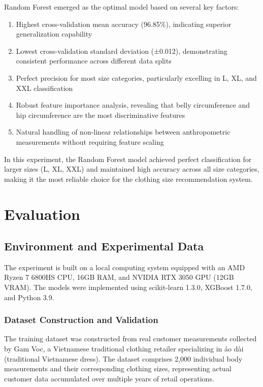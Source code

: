 \documentclass{llncs}
\begin{document}
Random Forest emerged as the optimal model based on several key factors:
\begin{enumerate}
    \item Highest cross-validation mean accuracy (96.85\%), indicating superior generalization capability
    \item Lowest cross-validation standard deviation (±0.012), demonstrating consistent performance across different data splits
    \item Perfect precision for most size categories, particularly excelling in L, XL, and XXL classification
    \item Robust feature importance analysis, revealing that belly circumference and hip circumference are the most discriminative features
    \item Natural handling of non-linear relationships between anthropometric measurements without requiring feature scaling
\end{enumerate}

In this experiment, the Random Forest model achieved perfect classification for larger sizes (L, XL, XXL) and maintained high accuracy across all size categories, making it the most reliable choice for the clothing size recommendation system.

\section{Evaluation}

\subsection{Environment and Experimental Data }
The experiment is built on a local computing system equipped with an AMD Ryzen 7 6800HS CPU, 16GB RAM, and NVIDIA RTX 3050 GPU (12GB VRAM). 
The models were implemented using scikit-learn 1.3.0, XGBoost 1.7.0, and Python 3.9.

\subsubsection{Dataset Construction and Validation}

The training dataset was constructed from real customer measurements collected by Gam Voc, a Vietnamese traditional clothing retailer specializing in áo dài (traditional Vietnamese dress). The dataset comprises 2,000 individual body measurements and their corresponding clothing sizes, representing actual customer data accumulated over multiple years of retail operations.
\end{document}
